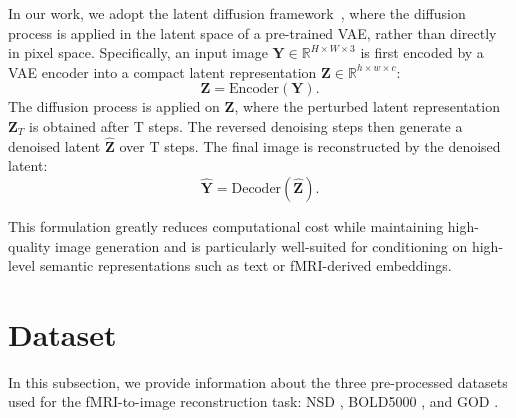 In our work, we adopt the latent diffusion framework~\citep{rombach2022high}, where the diffusion process is applied in the latent space of a pre-trained VAE, rather than directly in pixel space. Specifically, an input image \( \mathbf{Y} \in \mathbb{R}^{H \times W \times 3} \) is first encoded by a VAE encoder into a compact latent representation \( \mathbf{Z} \in \mathbb{R}^{h \times w \times c} \):
\[
\mathbf{Z} = \text{Encoder}(\mathbf{Y}).
\]
The diffusion process is applied on \(\mathbf{Z}\), where the perturbed latent representation \(\mathbf{Z}_T\) is obtained after T steps. The reversed denoising steps then generate a denoised latent \(\hat{\mathbf{Z}}\) over T steps. The final image is reconstructed by the denoised latent:
\[
\hat{\mathbf{Y}} = \text{Decoder}(\hat{\mathbf{Z}}).
\]

This formulation greatly reduces computational cost while maintaining high-quality image generation and is particularly well-suited for conditioning on high-level semantic representations such as text or fMRI-derived embeddings.


\section{Dataset}
\label{app:dataset}

In this subsection, we provide information about the three pre-processed datasets used for the fMRI-to-image reconstruction task: NSD \citep{allen2022massive}, BOLD5000 \citep{chang2019bold5000}, and GOD \citep{horikawa2017generic}. 

